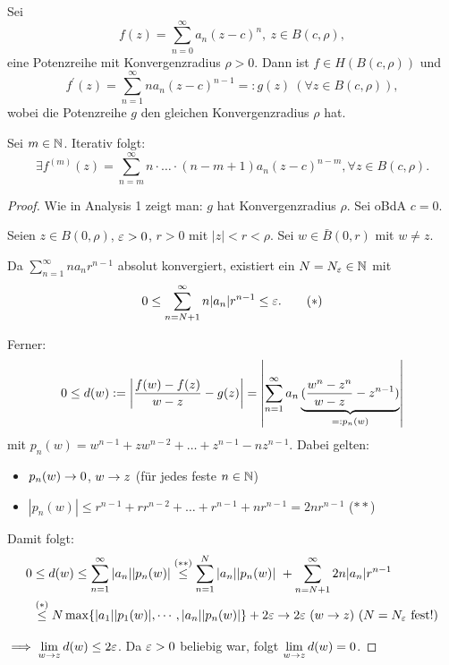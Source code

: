 \documentclass[a4paper,twoside,DIV15,BCOR12mm]{scrbook}
\begin{document}
\begin{satz} \label{satz1.3} Sei
\[f(z) = \sum_{n=0}^\infty a_n(z-c)^n,\ z\in B(c,\rho),\]
eine Potenzreihe mit Konvergenzradius $\rho > 0$. Dann ist $f\in H(B(c,\rho))$ und
\[f^\prime(z) = \sum_{n=1}^\infty n a_n(z-c)^{n-1} =: g(z)\ (\forall z\in B(c,\rho)),\]
wobei die Potenzreihe $g$ den gleichen Konvergenzradius $\rho$ hat.

Sei $m\in\mathbb{N}$. Iterativ folgt:
\[\exists f^{(m)}(z) = \sum_{n=m}^\infty n\cdot\dotsc\cdot (n-m+1) a_n(z-c)^{n-m}, \forall z\in B(c,\rho).\]
\end{satz}
\begin{proof} Wie in Analysis 1 zeigt man: $g$ hat Konvergenzradius $\rho$. Sei oBdA $c = 0$.

Seien $z\in B(0,\rho)$, $\varepsilon>0$, $r>0$ mit $|z|<r<\rho$. Sei $w\in \bar{B}(0,r)$ mit $w\neq z$.

Da $\sum_{n=1}^\infty na_nr^{n-1}$ absolut konvergiert, existiert ein $N = N_\varepsilon\in\mathbb{N}$ mit
\[0 \leq \sum_{n=N+1}^\infty n |a_n| r^{n-1} \leq \varepsilon.\tag{$\ast$}\]

Ferner:
\[0\leq d(w) := \left| \frac{f(w)-f(z)}{w-z} - g(z)\right| = \left| \sum_{n=1}^\infty a_n\underbrace{(\frac{w^n-z^n}{w-z} - z^{n-1})}_{=: p_n(w)}\right|\]
mit $p_n(w) = w^{n-1}+zw^{n-2}+\dotsc+z^{n-1}-nz^{n-1}$.
Dabei gelten:
\begin{itemize}
\item $p_n(w) \rightarrow 0$, $w\rightarrow z$ (für jedes feste $n\in\mathbb{N}$)
\item $|p_n(w)| \leq r^{n-1} + rr^{n-2} + \dotsc + r^{n-1} + nr^{n-1} = 2nr^{n-1}$ \hfill($\ast\ast$)
\end{itemize}

Damit folgt:
\begin{align*}
0&\leq d(w) \leq \sum_{n=1}^\infty |a_n||p_n(w)| \stackrel{(\ast\ast)}{\leq} \sum_{n=1}^N |a_n||p_n(w)|\ + \sum_{n=N+1}^\infty 2n|a_n|r^{n-1}\\
&\stackrel{(\ast)}{\leq} N \max\{|a_1||p_1(w)|,\dotsb,|a_n||p_n(w)|\} + 2\varepsilon \rightarrow 2\varepsilon\ (w\rightarrow z)\ (N = N_\varepsilon\ \text{fest!})
\end{align*}

$\displaystyle\implies \lim_{w\rightarrow z} d(w) \leq 2\varepsilon$. Da $\varepsilon>0$ beliebig war, folgt $\displaystyle\lim_{w\rightarrow z} d(w) = 0$.
\end{proof}
\end{document}
